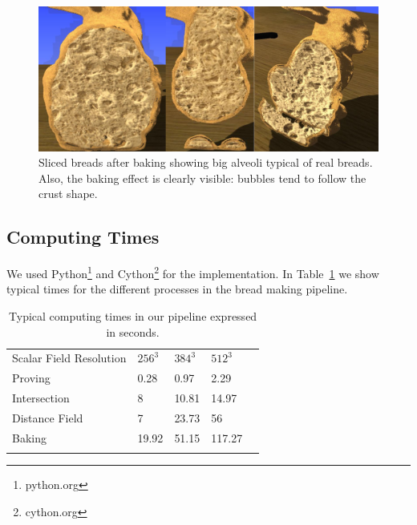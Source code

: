 \documentclass[spanish,a4paper,11pt,oneside,links]{report}
\begin{document}
\begin{figure}[!ht]
\begin{center}
\includegraphics[width=19cm]{figures/bakedbunny}
\caption{Sliced breads after baking showing big alveoli typical of real breads. Also, the baking effect is clearly visible: bubbles tend to follow the crust shape.}
\label{fg:bakedbunny}
\end{center}
\end{figure}



\subsection{Computing Times}
We used Python\footnote{python.org} and Cython\footnote{cython.org} for the implementation.
In Table~\ref{tab:computingtimes} we show typical times for the different processes in the bread making pipeline. %

\begin{table}[h!]
\begin{tabular}{lllll}
\hline\noalign{\smallskip}
Scalar Field Resolution & $256^{3}$ & $384^{3}$  & $512^{3}$ \\
\noalign{\smallskip}\hline\noalign{\smallskip}
Proving & 0.28 & 0.97 & 2.29 \\
Intersection & 8 & 10.81 & 14.97 \\
Distance Field & 7 & 23.73 & 56 \\
Baking & 19.92 & 51.15 & 117.27 \\
\noalign{\smallskip}\hline
\end{tabular}
\caption{Typical computing times in our pipeline expressed in seconds.}
\label{tab:computingtimes}
\end{table}
\end{document}
